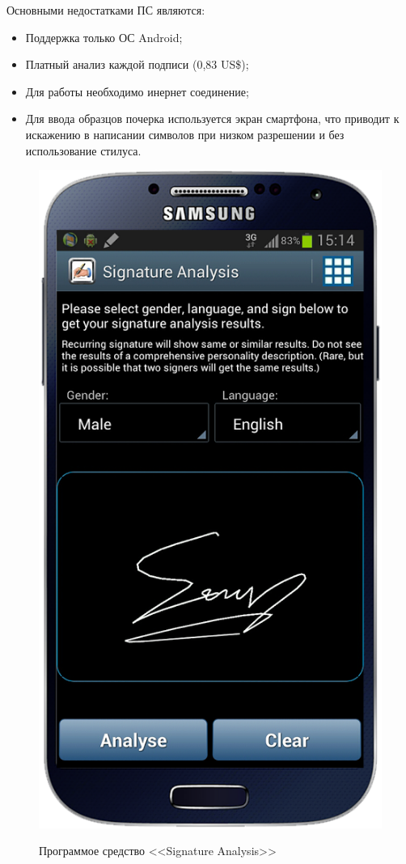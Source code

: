 Основными недостатками ПС являются:
\begin{itemize}
  \item Поддержка только ОС Android;
  \item Платный анализ каждой подписи (0,83 US\$);
  \item Для работы необходимо инернет соединение;
  \item Для ввода образцов почерка используется экран смартфона, что приводит к искажению в написании символов при низком разрешении и без использование стилуса.
\end{itemize}

\begin{figure}[ht]{}
    \centering
    \label{fig:domain:analogs:signature_analysis}
    \includegraphics[height=0.5\textheight]{figures/analog_signature_analysis.png}
    \caption{Программое средство <<Signature Analysis>>}
\end{figure}

